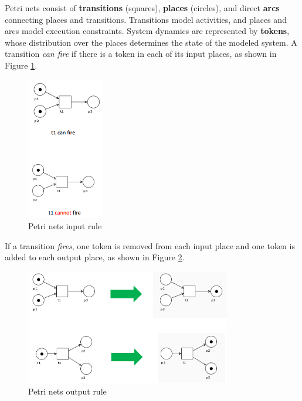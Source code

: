 Petri nets consist of \textbf{transitions} (squares), \textbf{places} (circles), and direct \textbf{arcs} connecting places and transitions. Transitions model activities, and places and arcs model execution constraints. System dynamics are represented by \textbf{tokens}, whose distribution over the places determines the state of the modeled system. A transition \textit{can fire} if there is a token in each of its input places, as shown in Figure \ref{fig:petri-nets-input}.

\begin{figure} [H]
    \centering
    \includegraphics[width=0.3\textwidth]{images/BusinessProcessModeling/petri-nets-input.PNG}
    \caption{Petri nets input rule}
    \label{fig:petri-nets-input}
\end{figure} 

If a transition \textit{fires}, one token is removed from each input place and one token is added to each output place, as shown in Figure \ref{fig:petri-nets-output}.

\begin{figure} [H]
    \centering
    \includegraphics[width=0.8\textwidth]{images/BusinessProcessModeling/petri-nets-output.PNG}
    \caption{Petri nets output rule}
    \label{fig:petri-nets-output}
\end{figure} 

